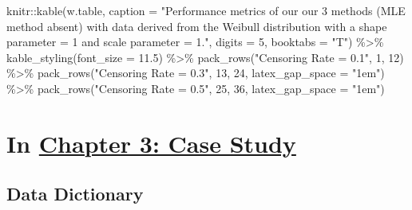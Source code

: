 \documentclass[12pt, twoside]{amherstthesis}
\newenvironment{Shaded}{\begin{snugshade}}{\end{snugshade}}
\newcommand{\AttributeTok}[1]{\textcolor[rgb]{0.77,0.63,0.00}{#1}}
\newcommand{\DecValTok}[1]{\textcolor[rgb]{0.00,0.00,0.81}{#1}}
\newcommand{\FloatTok}[1]{\textcolor[rgb]{0.00,0.00,0.81}{#1}}
\newcommand{\FunctionTok}[1]{\textcolor[rgb]{0.00,0.00,0.00}{#1}}
\newcommand{\NormalTok}[1]{#1}
\newcommand{\SpecialCharTok}[1]{\textcolor[rgb]{0.00,0.00,0.00}{#1}}
\newcommand{\StringTok}[1]{\textcolor[rgb]{0.31,0.60,0.02}{#1}}
\begin{document}
\begin{Shaded}
\begin{Highlighting}[]
\NormalTok{knitr}\SpecialCharTok{::}\FunctionTok{kable}\NormalTok{(w.table, }\AttributeTok{caption =} \StringTok{"Performance metrics of our our 3 methods }
\StringTok{             (MLE method absent) with data derived from the Weibull }
\StringTok{             distribution with a shape parameter = 1 and }
\StringTok{             scale parameter = 1."}\NormalTok{, }
             \AttributeTok{digits =} \DecValTok{5}\NormalTok{, }\AttributeTok{booktabs =} \StringTok{"T"}\NormalTok{) }\SpecialCharTok{\%\textgreater{}\%}
  \FunctionTok{kable\_styling}\NormalTok{(}\AttributeTok{font\_size =} \FloatTok{11.5}\NormalTok{) }\SpecialCharTok{\%\textgreater{}\%}
  \FunctionTok{pack\_rows}\NormalTok{(}\StringTok{"Censoring Rate = 0.1"}\NormalTok{, }\DecValTok{1}\NormalTok{, }\DecValTok{12}\NormalTok{) }\SpecialCharTok{\%\textgreater{}\%}
  \FunctionTok{pack\_rows}\NormalTok{(}\StringTok{"Censoring Rate = 0.3"}\NormalTok{, }\DecValTok{13}\NormalTok{, }\DecValTok{24}\NormalTok{, }\AttributeTok{latex\_gap\_space =} \StringTok{"1em"}\NormalTok{) }\SpecialCharTok{\%\textgreater{}\%}
  \FunctionTok{pack\_rows}\NormalTok{(}\StringTok{"Censoring Rate = 0.5"}\NormalTok{, }\DecValTok{25}\NormalTok{, }\DecValTok{36}\NormalTok{, }\AttributeTok{latex\_gap\_space =} \StringTok{"1em"}\NormalTok{)}
\end{Highlighting}
\end{Shaded}
\hypertarget{in-chapter-3-case-study}{%
\section{\texorpdfstring{In \protect\hyperlink{casestudy}{Chapter 3: Case Study}}{In Chapter 3: Case Study}}\label{in-chapter-3-case-study}}

\hypertarget{data-dictionary}{%
\subsection{Data Dictionary}\label{data-dictionary}}
\end{document}
